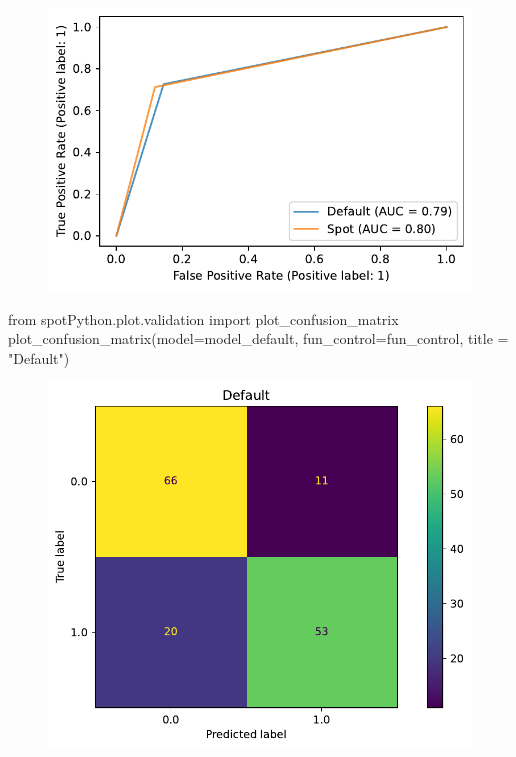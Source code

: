 \documentclass[
  letterpaper,
  DIV=11,
  numbers=noendperiod]{scrreprt}
\newenvironment{Shaded}{\begin{snugshade}}{\end{snugshade}}
\newcommand{\ImportTok}[1]{\textcolor[rgb]{0.00,0.46,0.62}{#1}}
\newcommand{\NormalTok}[1]{\textcolor[rgb]{0.00,0.23,0.31}{#1}}
\newcommand{\OperatorTok}[1]{\textcolor[rgb]{0.37,0.37,0.37}{#1}}
\newcommand{\StringTok}[1]{\textcolor[rgb]{0.13,0.47,0.30}{#1}}
\begin{document}
\begin{figure}[H]

{\centering \includegraphics{017_spot_hpt_sklearn_classification_files/figure-pdf/cell-30-output-1.pdf}

}

\end{figure}

\begin{Shaded}
\begin{Highlighting}[]
\ImportTok{from}\NormalTok{ spotPython.plot.validation }\ImportTok{import}\NormalTok{ plot\_confusion\_matrix}
\NormalTok{plot\_confusion\_matrix(model}\OperatorTok{=}\NormalTok{model\_default, fun\_control}\OperatorTok{=}\NormalTok{fun\_control, title }\OperatorTok{=} \StringTok{"Default"}\NormalTok{)}
\end{Highlighting}
\end{Shaded}

\begin{figure}[H]

{\centering \includegraphics{017_spot_hpt_sklearn_classification_files/figure-pdf/cell-31-output-1.pdf}

}

\end{figure}
\end{document}
